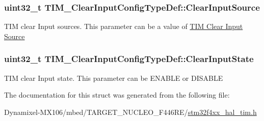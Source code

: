 \subsubsection[{\texorpdfstring{Clear\+Input\+Source}{ClearInputSource}}]{\setlength{\rightskip}{0pt plus 5cm}uint32\+\_\+t T\+I\+M\+\_\+\+Clear\+Input\+Config\+Type\+Def\+::\+Clear\+Input\+Source}\hypertarget{struct_t_i_m___clear_input_config_type_def_a776d2f14021a82e022468fd46594b8a0}{}\label{struct_t_i_m___clear_input_config_type_def_a776d2f14021a82e022468fd46594b8a0}
T\+IM clear Input sources. This parameter can be a value of \hyperlink{group___t_i_m___clear_input___source}{T\+IM Clear Input Source} 
\subsubsection[{\texorpdfstring{Clear\+Input\+State}{ClearInputState}}]{\setlength{\rightskip}{0pt plus 5cm}uint32\+\_\+t T\+I\+M\+\_\+\+Clear\+Input\+Config\+Type\+Def\+::\+Clear\+Input\+State}\hypertarget{struct_t_i_m___clear_input_config_type_def_a01d4b91dd297c4f0582a4d9179abf32f}{}\label{struct_t_i_m___clear_input_config_type_def_a01d4b91dd297c4f0582a4d9179abf32f}
T\+IM clear Input state. This parameter can be E\+N\+A\+B\+LE or D\+I\+S\+A\+B\+LE 

The documentation for this struct was generated from the following file\+:\begin{DoxyCompactItemize}
\item 
Dynamixel-\/\+M\+X106/mbed/\+T\+A\+R\+G\+E\+T\+\_\+\+N\+U\+C\+L\+E\+O\+\_\+\+F446\+R\+E/\hyperlink{stm32f4xx__hal__tim_8h}{stm32f4xx\+\_\+hal\+\_\+tim.\+h}\end{DoxyCompactItemize}
